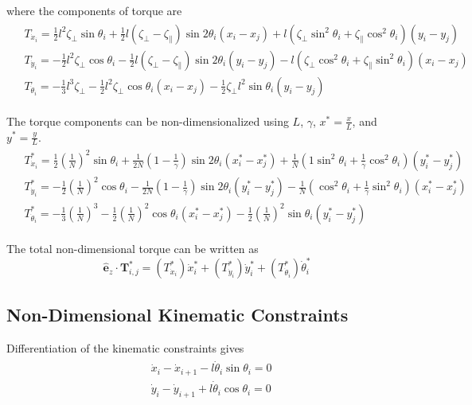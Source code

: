\documentclass[12pt,letterpaper,titlepage]{article}
\newcommand{\uvec}[1]{\mathbf{\hat{#1}}}
\begin{document}
where the components of torque are
\begin{align}
\begin{split}
&T_{\dot{x}_i} = \frac{1}{2} l^2 \zeta_{\bot} \sin \theta_i + \frac{1}{2} l (\zeta_{\bot} - \zeta_{\parallel}) \sin 2 \theta_i (x_i - x_j) + l (\zeta_{\bot} \sin^2 \theta_i + \zeta_{\parallel} \cos^2 \theta_i)(y_i - y_j) \\
&T_{\dot{y}_i} = - \frac{1}{2} l^2 \zeta_{\bot} \cos \theta_i - \frac{1}{2} l (\zeta_{\bot} - \zeta_{\parallel}) \sin 2 \theta_i (y_i - y_j) - l (\zeta_{\bot}\cos^2 \theta_i + \zeta_{\parallel} \sin^2 \theta_i)(x_i - x_j) \\
&T_{\dot{\theta}_i} = - \frac{1}{3} l^3 \zeta_{\bot} - \frac{1}{2} l^2 \zeta_{\bot} \cos \theta_i (x_i - x_j) - \frac{1}{2} \zeta_{\bot} l^2 \sin \theta_i (y_i - y_j)
\end{split}
\end{align}

The torque components can be non-dimensionalized using $L$, $\gamma$, $x^* = \frac{x}{L}$, and $y^* = \frac{y}{L}$.
\begin{align}
\begin{split}
&T_{\dot{x}_i}^* = \frac{1}{2} (\frac{1}{N})^2 \sin \theta_i + \frac{1}{2N} (1 - \frac{1}{\gamma}) \sin 2 \theta_i (x_i^* - x_j^*) + \frac{1}{N} (1 \sin^2 \theta_i + \frac{1}{\gamma} \cos^2 \theta_i)(y_i^* - y_j^*) \\
&T_{\dot{y}_i}^* = - \frac{1}{2} (\frac{1}{N})^2 \cos \theta_i - \frac{1}{2N} (1 - \frac{1}{\gamma}) \sin 2 \theta_i (y_i^* - y_j^*) - \frac{1}{N} (\cos^2 \theta_i + \frac{1}{\gamma} \sin^2 \theta_i)(x_i^* - x_j^*) \\
&T_{\dot{\theta}_i}^* = - \frac{1}{3} (\frac{1}{N})^3 - \frac{1}{2} (\frac{1}{N})^2 \cos \theta_i (x_i^* - x_j^*) - \frac{1}{2} (\frac{1}{N})^2 \sin \theta_i (y_i^* - y_j^*)
\end{split}
\end{align}

The total non-dimensional torque can be written as
\begin{equation}
\uvec{e}_z \cdot \mathbf{T}_{i,j}^* = (T_{\dot{x}_i}^*) \dot{x}_i^* + (T_{\dot{y}_i}^*) \dot{y}_i^* + (T_{\dot{\theta}_i}^*) \dot{\theta}_i^*
\end{equation}

\newpage

\subsection{Non-Dimensional Kinematic Constraints}
Differentiation of the kinematic constraints gives
\begin{align}
\begin{split}
& \dot{x}_i - \dot{x}_{i+1} - l \dot{\theta}_i \sin \theta_i = 0 \\
& \dot{y}_i - \dot{y}_{i+1} + l \dot{\theta}_i \cos \theta_i = 0
\end{split}
\end{align}
\end{document}
